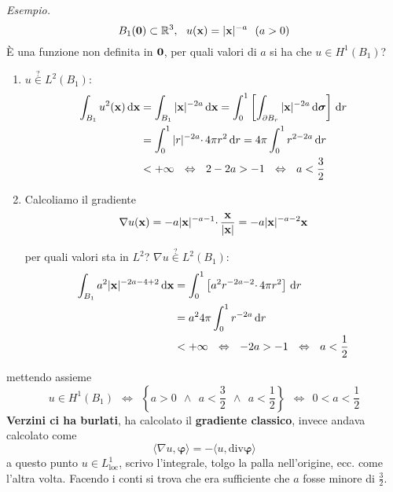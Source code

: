 \textit{Esempio.}
\begin{equation*}
    B_{1}(\mathbf{0}) \subset \mathbb{R}^{3} ,\ \ u(\mathbf{x}) =| \mathbf{x}| ^{-a} \ \ (a >0)
\end{equation*}
È una funzione non definita in $\mathbf{0}$, per quali valori di $a$ si ha che $u\in H^{1}(B_{1})$?
\begin{enumerate}
    \item $u\overset{?}{\in } L^{2}(B_{1}) :$
          \begin{align*}
              \int _{B_{1}} u^{2}(\x) \dxx & =\int _{B_{1}}| \x| ^{-2a} \dxx =\int ^{1}_{0}\left[\int _{\partial B_{r}}| \x| ^{-2a} \dsig \right] \dr \\
                                           & =\int ^{1}_{0}| r| ^{-2a} \cdotp 4\pi r^{2} \dr=4\pi \int ^{1}_{0} r^{2-2a} \dr                          \\
                                           & < +\infty \ \ \Leftrightarrow \ \ 2-2a >-1\ \ \Leftrightarrow \ \ a< \frac{3}{2}
          \end{align*}
    \item Calcoliamo il gradiente
          \begin{equation*}
              \nabla u(\mathbf{x}) =-a| \mathbf{x}| ^{-a-1} \cdotp \frac{\mathbf{x}}{| \mathbf{x}| } =-a| \mathbf{x}| ^{-a-2}\mathbf{x}
          \end{equation*}

          per quali valori sta in $L^{2}$? $\nabla u\overset{?}{\in } L^{2}(B_{1}) :$
          \begin{align*}
              \int _{B_{1}} a^{2}| \mathbf{x}| ^{-2a-4+2} \,\mathrm d \mathbf{x} & =\int ^{1}_{0}\left[ a^{2} r^{-2a-2} \cdotp 4\pi r^{2}\right] \,\mathrm d r               \\
                                                       & =a^{2} 4\pi \int ^{1}_{0} r^{-2a} \,\mathrm d r                                           \\
                                                       & < +\infty \ \ \Leftrightarrow \ \ -2a >-1\ \ \Leftrightarrow \ \ a< \frac{1}{2}
          \end{align*}
\end{enumerate}

mettendo assieme
\begin{equation*}
    u\in H^{1}(B_{1}) \ \ \Leftrightarrow \ \ \left\{a >0\ \ \land \ \ a< \frac{3}{2} \ \ \land \ \ a< \frac{1}{2}\right\} \ \ \Leftrightarrow \ \ 0< a< \frac{1}{2}
\end{equation*}
\textbf{Verzini ci ha burlati}, ha calcolato il \textbf{gradiente classico}, invece andava calcolato come
\begin{equation*}
    \langle \nabla u,\bm{\varphi} \rangle =-\langle u,\mathrm{div}\bm{\varphi} \rangle
\end{equation*}
a questo punto $u\in L^{1}_{\mathrm{loc}}$, scrivo l'integrale, tolgo la palla nell'origine, ecc. come l'altra volta. Facendo i conti si trova che era sufficiente che $a$ fosse minore di $\frac{3}{2}$.

